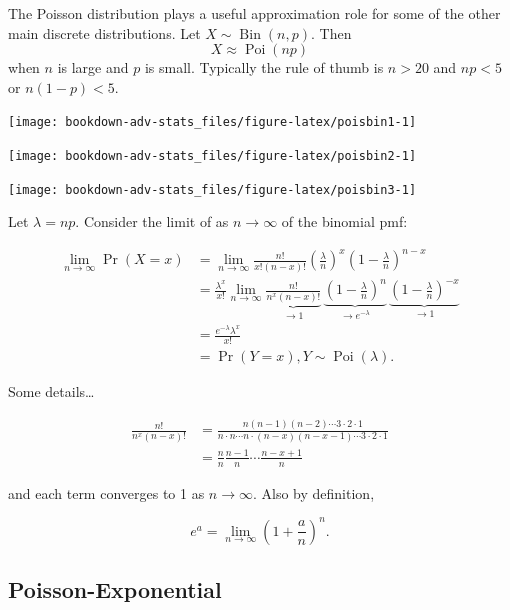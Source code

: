 \documentclass[
]{book}
\DeclareMathOperator{\Bin}{Bin}
\DeclareMathOperator{\Pois}{Poi}
\theoremstyle{definition}
\theoremstyle{definition}
\theoremstyle{definition}
\theoremstyle{definition}
\theoremstyle{remark}
\begin{document}
The Poisson distribution plays a useful approximation role for some of the other main discrete distributions.
Let \(X\sim\Bin(n,p)\).
Then
\[
X \approx \Pois(np)
\]
when \(n\) is large and \(p\) is small.
Typically the rule of thumb is \(n>20\) and \(np<5\) or \(n(1-p)<5\).

\begin{center}\texttt{[image: bookdown-adv-stats\_files/figure-latex/poisbin1-1]} \end{center}

\begin{center}\texttt{[image: bookdown-adv-stats\_files/figure-latex/poisbin2-1]} \end{center}

\begin{center}\texttt{[image: bookdown-adv-stats\_files/figure-latex/poisbin3-1]} \end{center}

Let \(\lambda=np\). Consider the limit of as \(n\to\infty\) of the binomial pmf:

\begin{align*}
\lim_{n\to\infty} \Pr(X=x) 
&= \lim_{n\to\infty} \frac{n!}{x!(n-x)!}\left(\frac{\lambda}{n} \right)^x \left(1 - \frac{\lambda}{n} \right)^{n-x} \\
&= \frac{\lambda^x}{x!} \lim_{n\to\infty} 
\underbrace{\frac{n!}{n^x(n-x)!}}_{\to 1}
\,
\underbrace{\left(1 - \frac{\lambda}{n} \right)^n}_{\to e^{-\lambda}}
\,
\underbrace{\left(1 - \frac{\lambda}{n} \right)^{-x}}_{\to 1} \\
&=  \frac{e^{-\lambda}\lambda^x}{x!} \\
&= \Pr(Y=x), Y\sim\Pois(\lambda).
\end{align*}

Some details\ldots{}

\begin{align*}
\frac{n!}{n^x(n-x)!}
&= \frac{n(n-1)(n-2)\cdots 3\cdot 2 \cdot 1}{n \cdot n \cdots n \cdot (n-x)(n-x-1)\cdots 3\cdot 2 \cdot 1} \\
&= \frac{n}{n}\frac{n-1}{n} \cdots \frac{n-x+1}{n}
\end{align*}

and each term converges to 1 as \(n\to\infty\).
Also by definition,

\[
e^a = \lim_{n\to\infty }\left(1 + \frac{a}{n} \right)^n.
\]

\hypertarget{poisson-exponential}{%
\subsection{Poisson-Exponential}\label{poisson-exponential}}
\end{document}
